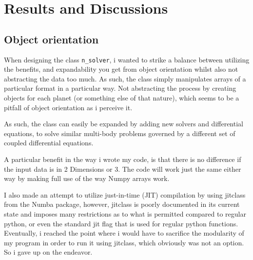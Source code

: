 \documentclass[10pt,showpacs,preprintnumbers,amsmath,amssymb,nofootinbib,aps,prl,twocolumn,groupedaddress,superscriptaddress,showkeys]{revtex4-1}
\begin{document}
\section{Results and Discussions}
  \subsection{Object orientation}
    When designing the class \lstinline{n_solver}, i wanted to strike a balance between utilizing the benefits, and expandability you get from object orientation whilst also not abstracting the data too much. As such, the class simply manipulates arrays of a particular format in a particular way. Not abstracting the process by creating objects for each planet (or something else of that nature), which seems to be a pitfall of object orientation as i perceive it.

    As such, the class can easily be expanded by adding new solvers and differential equations, to solve similar multi-body problems governed by a different set of coupled differential equations.

    A particular benefit in the way i wrote my code, is that there is no difference if the input data is in 2 Dimensions or 3. The code will work just the same either way by making full use of the way Numpy arrays work.

    I also made an attempt to utilize just-in-time (JIT) compilation by using jitclass from the Numba package, however, jitclass is poorly documented in its current state and imposes many restrictions as to what is permitted compared to regular python, or even the standard jit flag that is used for regular python functions. Eventually, i reached the point where i would have to sacrifice the modularity of my program in order to run it using jitclass, which obviously was not an option. So i gave up on the endeavor.
\end{document}
